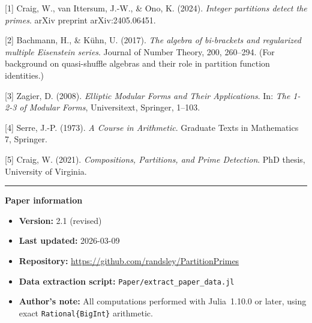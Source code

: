 \documentclass[
  11pt,
]{article}
\providecommand{\tightlist}{%
  \setlength{\itemsep}{0pt}\setlength{\parskip}{0pt}}
\begin{document}
{[}1{]} Craig, W., van Ittersum, J.-W., \& Ono, K. (2024). \emph{Integer
partitions detect the primes}. arXiv preprint arXiv:2405.06451.

{[}2{]} Bachmann, H., \& Kühn, U. (2017). \emph{The algebra of
bi-brackets and regularized multiple Eisenstein series}. Journal of
Number Theory, 200, 260--294. (For background on quasi-shuffle algebras
and their role in partition function identities.)

{[}3{]} Zagier, D. (2008). \emph{Elliptic Modular Forms and Their
Applications}. In: \emph{The 1-2-3 of Modular Forms}, Universitext,
Springer, 1--103.

{[}4{]} Serre, J.-P. (1973). \emph{A Course in Arithmetic}. Graduate
Texts in Mathematics 7, Springer.

{[}5{]} Craig, W. (2021). \emph{Compositions, Partitions, and Prime
Detection}. PhD thesis, University of Virginia.

\begin{center}\rule{0.5\linewidth}{0.5pt}\end{center}

\textbf{Paper information}
\begin{itemize}
\tightlist
\item \textbf{Version:} 2.1 (revised)
\item \textbf{Last updated:} 2026-03-09
\item \textbf{Repository:} \url{https://github.com/randsley/PartitionPrimes}
\item \textbf{Data extraction script:} \texttt{Paper/extract\_paper\_data.jl}
\item \textbf{Author's note:} All computations performed with Julia~1.10.0 or later, using exact \texttt{Rational\{BigInt\}} arithmetic.
\end{itemize}
\end{document}
